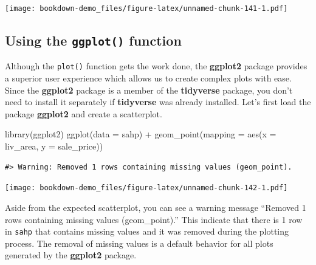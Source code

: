 \documentclass[
]{book}
\newenvironment{Shaded}{\begin{snugshade}}{\end{snugshade}}
\newcommand{\AttributeTok}[1]{\textcolor[rgb]{0.77,0.63,0.00}{#1}}
\newcommand{\FunctionTok}[1]{\textcolor[rgb]{0.00,0.00,0.00}{#1}}
\newcommand{\NormalTok}[1]{#1}
\newcommand{\SpecialCharTok}[1]{\textcolor[rgb]{0.00,0.00,0.00}{#1}}
\newcommand{\StringTok}[1]{\textcolor[rgb]{0.31,0.60,0.02}{#1}}
\begin{document}
\begin{Shaded}
\end{Shaded}

\texttt{[image: bookdown-demo\_files/figure-latex/unnamed-chunk-141-1.pdf]}

\hypertarget{using-the-ggplot-function}{%
\subsection{\texorpdfstring{Using the \texttt{ggplot()} function}{Using the ggplot() function}}\label{using-the-ggplot-function}}

Although the \texttt{plot()} function gets the work done, the \textbf{ggplot2} package provides a superior user experience which allows us to create complex plots with ease. Since the \textbf{ggplot2} package is a member of the \textbf{tidyverse} package, you don't need to install it separately if \textbf{tidyverse} was already installed. Let's first load the package \textbf{ggplot2} and create a scatterplot.

\begin{Shaded}
\begin{Highlighting}[]
\FunctionTok{library}\NormalTok{(ggplot2)}
\FunctionTok{ggplot}\NormalTok{(}\AttributeTok{data =}\NormalTok{ sahp) }\SpecialCharTok{+} \FunctionTok{geom\_point}\NormalTok{(}\AttributeTok{mapping =} \FunctionTok{aes}\NormalTok{(}\AttributeTok{x =}\NormalTok{ liv\_area, }\AttributeTok{y =}\NormalTok{ sale\_price))}
\end{Highlighting}
\end{Shaded}

\begin{verbatim}
#> Warning: Removed 1 rows containing missing values (geom_point).
\end{verbatim}

\texttt{[image: bookdown-demo\_files/figure-latex/unnamed-chunk-142-1.pdf]}

Aside from the expected scatterplot, you can see a warning message ``Removed 1 rows containing missing values (geom\_point).'' This indicate that there is 1 row in \texttt{sahp} that contains missing values and it was removed during the plotting process. The removal of missing values is a default behavior for all plots generated by the \textbf{ggplot2} package.
\end{document}
